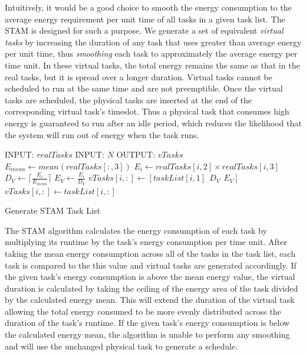 Intuitively, it would be a good choice to smooth the energy consumption to the average energy requirement per unit time of all tasks in a given task list. The STAM is designed for such a purpose. We generate a set of equivalent \emph{virtual tasks} by increasing the duration of any task that uses greater than average energy per unit time, thus \emph{smoothing} each task to approximately the average energy per time unit. In these virtual tasks, the total energy remains the same as that in the real tasks, but it is spread over a longer duration.  Virtual tasks cannot be scheduled to run at the same time and are not preemptible.  Once the virtual tasks are scheduled, the physical tasks are inserted at the end of the corresponding virtual task's timeslot.  Thus a physical task that consumes high energy is guaranteed to run after an idle period, which reduces the likelihood that the system will run out of energy when the task runs. 

\begin{algorithm}[htb]
\label{stamalg}
\begin{algorithmic}
\STATE INPUT: $realTasks$  
\STATE INPUT: $N$ 
\STATE OUTPUT: $vTasks$ 
\STATE $E_{mean} \gets mean(realTasks[:,3])$
\STATE $E_i \gets realTasks[i, 2] \times realTasks[i,3]$
\STATE $D_V \gets \lceil \frac{E_i}{E_{mean}} \rceil$
\STATE $E_V \gets \frac{E_i}{D_V}$
\STATE $vTasks[i,:] \gets [taskList[i,1]~~D_V~~E_V]$
\ELSE
\STATE $vTasks[i,:] \gets taskList[i,:]$
\ENDIF
\ENDFOR
\end{algorithmic}
\caption{Generate \textsc{STAM} Task List}
\end{algorithm}

The \textsc{STAM} algorithm calculates the energy consumption of each task by multiplying its runtime by the task's energy consumption per time unit. After taking the mean energy consumption across all of the tasks in the task list, each task is compared to the this value and virtual tasks are generated accordingly. If the given task's energy consumption is above the mean energy value, the virtual duration is calculated by taking the ceiling of the energy area of the task divided by the calculated energy mean. This will extend the duration of the virtual task allowing the total energy consumed to be more evenly distributed across the duration of the task's runtime. If the given task's energy consumption is below the calculated energy mean, the algorithm is unable to perform any smoothing and  will use the unchanged physical task to generate a schedule.

